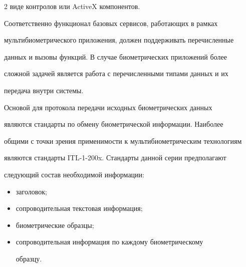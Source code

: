 \begin{multicols}{2}
виде контролов или ActiveX компонентов.

  

  Соответственно функционал базовых сервисов, работающих в рамках 

мультибиометрического приложения, должен поддерживать перечисленные %

 данных и вызовы функций. В случае биометрических приложений более 

сложной задачей является работа с перечисленными типами данных и их 

передача внутри системы. 

  

  Основой для протокола передачи исходных биометрических данных 

являются стандарты по обмену биометрической информации. Наиболее 

общими с точки зрения применимости к мультибиометрическим технологиям 

являются стандарты ITL-1-200x. Стандарты данной серии предполагают 

следующий состав необходимой информации:

  \begin{itemize}

\item заголовок;

\item сопроводительная текстовая информация;

\item биометрические образцы;

\item сопроводительная информация по каждому биометрическому 

образцу.

\end{itemize}



  \begin{table}\small

  \begin{center}


  \vspace*{2ex}

  

  \begin{tabular}{|c|p{70mm}|c|}


\end{tabular}
\end{center}
\end{table}
\end{multicols}
